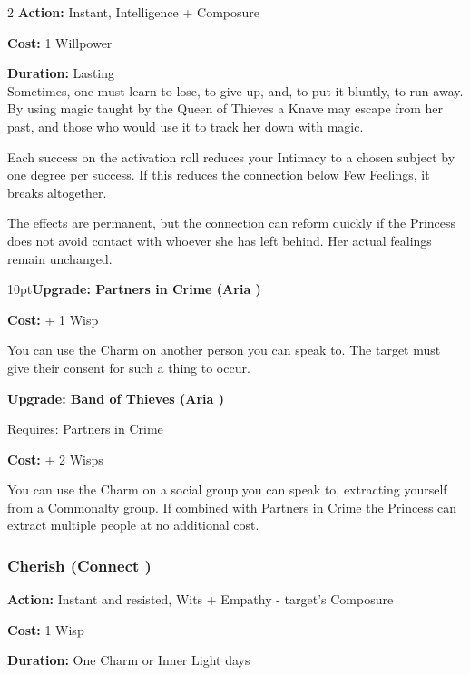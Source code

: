 \begin{multicols}{2}
\noindent \textbf{Action:} Instant, Intelligence + Composure 

\noindent \textbf{Cost:} 1 Willpower

\noindent \textbf{Duration:} Lasting \\

\noindent Sometimes, one must learn to lose, to give up, and, to put it bluntly, to run away. By using magic taught by the Queen of Thieves a Knave may escape from her past, and those who would use it to track her down with magic.

Each success on the activation roll reduces your Intimacy to a chosen subject by one degree per success. If this reduces the connection below Few Feelings, it breaks altogether. 

The effects are permanent, but the connection can reform quickly if the Princess does not avoid contact with whoever she has left behind. Her actual fealings remain unchanged.

\begin{myindentpar}{10pt}\textbf{Upgrade: Partners in Crime (Aria \textbullet\textbullet\textbullet\textbullet)}

\noindent \textbf{Cost:} + 1 Wisp

You can use the Charm on another person you can speak to. The target must give their consent for such a thing to occur.

\textbf{Upgrade: Band of Thieves (Aria \textbullet\textbullet\textbullet\textbullet\textbullet)}

\noindent Requires: Partners in Crime

\noindent \textbf{Cost:} + 2 Wisps

You can use the Charm on a social group you can speak to, extracting yourself from a Commonalty group. If combined with Partners in Crime the Princess can extract multiple people at no additional cost.\end{myindentpar}

\subsubsection*{Cherish (Connect \textbullet\textbullet\textbullet)}

\noindent \textbf{Action:} Instant and resisted, Wits + Empathy - target's Composure

\noindent \textbf{Cost:} 1 Wisp

\noindent \textbf{Duration:} One Charm or Inner Light days \\


\end{multicols}
